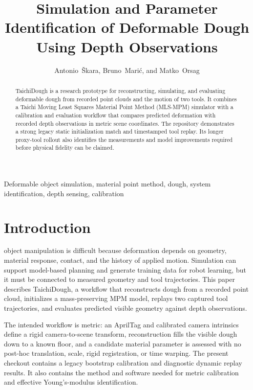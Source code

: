 \documentclass[conference]{IEEEtran}
\title{Simulation and Parameter Identification of Deformable Dough Using Depth Observations}
\author{Antonio~\v{S}kara, Bruno~Mari\'c, and Matko~Orsag}
\begin{document}
\maketitle

\begin{abstract}
TaichiDough is a research prototype for reconstructing, simulating, and evaluating deformable dough from recorded point clouds and the motion of two tools. It combines a Taichi Moving Least Squares Material Point Method (MLS-MPM) simulator with a calibration and evaluation workflow that compares predicted deformation with recorded depth observations in metric scene coordinates. The repository demonstrates a strong legacy static initialization match and timestamped tool replay. Its longer proxy-tool rollout also identifies the measurements and model improvements required before physical fidelity can be claimed.
\end{abstract}

\begin{IEEEkeywords}
Deformable object simulation, material point method, dough, system identification, depth sensing, calibration
\end{IEEEkeywords}

\section{Introduction}
 object manipulation is difficult because deformation depends on geometry, material response, contact, and the history of applied motion. Simulation can support model-based planning and generate training data for robot learning, but it must be connected to measured geometry and tool trajectories. This paper describes TaichiDough, a workflow that reconstructs dough from a recorded point cloud, initializes a mass-preserving MPM model, replays two captured tool trajectories, and evaluates predicted visible geometry against depth observations.

The intended workflow is metric: an AprilTag and calibrated camera intrinsics define a rigid camera-to-scene transform, reconstruction fills the visible dough down to a known floor, and a candidate material parameter is assessed with no post-hoc translation, scale, rigid registration, or time warping. The present checkout contains a legacy bootstrap calibration and diagnostic dynamic replay results. It also contains the method and software needed for metric calibration and effective Young's-modulus identification.
\end{document}
